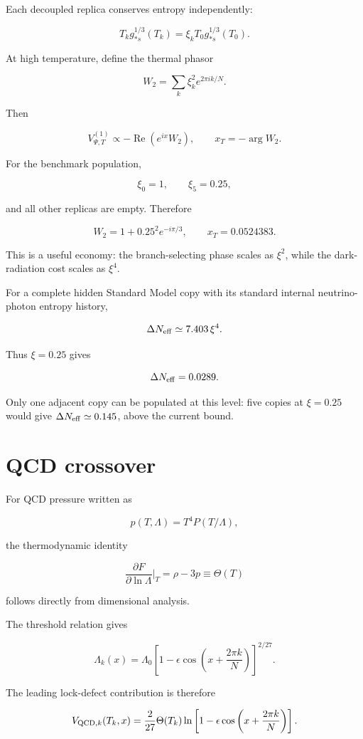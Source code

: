 \documentclass[
  10pt,
]{article}
\begin{document}
Each decoupled replica conserves entropy independently:

\[
T_k g_{*s}^{1/3}(T_k)
=\xi_k T_0 g_{*s}^{1/3}(T_0).
\]

At high temperature, define the thermal phasor

\[
W_2=\sum_k\xi_k^2e^{2\pi ik/N}.
\]

Then

\[
V_{\Psi,T}^{(1)}\propto-\operatorname{Re}\left(e^{ix}W_2\right),
\qquad
x_T=-\arg W_2.
\]

For the benchmark population,

\[
\xi_0=1,\qquad \xi_5=0.25,
\]

and all other replicas are empty. Therefore

\[
W_2=1+0.25^2e^{-i\pi/3},
\qquad
\boxed{x_T=0.0524383}.
\]

This is a useful economy: the branch-selecting phase scales as
\(\xi^2\), while the dark-radiation cost scales as \(\xi^4\).

For a complete hidden Standard Model copy with its standard internal
neutrino-photon entropy history,

\[
\Delta N_{\rm eff}\simeq7.403\,\xi^4.
\]

Thus \(\xi=0.25\) gives

\[
\Delta N_{\rm eff}=0.0289.
\]

Only one adjacent copy can be populated at this level: five copies at
\(\xi=0.25\) would give \(\Delta N_{\rm eff}\simeq0.145\), above the
current bound.

\section{QCD crossover}\label{qcd-crossover}

For QCD pressure written as

\[
p(T,\Lambda)=T^4P(T/\Lambda),
\]

the thermodynamic identity

\[
\frac{\partial F}{\partial\ln\Lambda}\bigg|_T
=\rho-3p\equiv\Theta(T)
\]

follows directly from dimensional analysis.

The threshold relation gives

\[
\Lambda_k(x)=\Lambda_0
\left[1-\epsilon\cos\left(x+\frac{2\pi k}{N}\right)\right]^{2/27}.
\]

The leading lock-defect contribution is therefore

\[
V_{{\rm QCD},k}(T_k,x)
=\frac{2}{27}\Theta(T_k)
\ln\left[1-\epsilon\cos\left(x+\frac{2\pi k}{N}\right)\right].
\]
\end{document}
